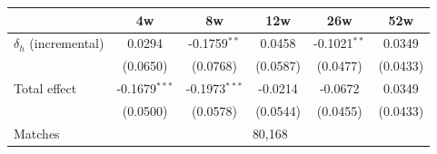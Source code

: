 \begin{tabular}{l*{5}{c}}
\toprule
 & 4w & 8w & 12w & 26w & 52w \\
\midrule
$\delta_h$ (incremental) & 0.0294 & -0.1759$^{**}$ & 0.0458 & -0.1021$^{**}$ & 0.0349 \\
 & (0.0650) & (0.0768) & (0.0587) & (0.0477) & (0.0433) \\[0.3em]
Total effect & -0.1679$^{***}$ & -0.1973$^{***}$ & -0.0214 & -0.0672 & 0.0349 \\
 & (0.0500) & (0.0578) & (0.0544) & (0.0455) & (0.0433) \\
\midrule
Matches & \multicolumn{5}{c}{80,168} \\
\bottomrule
\end{tabular}
